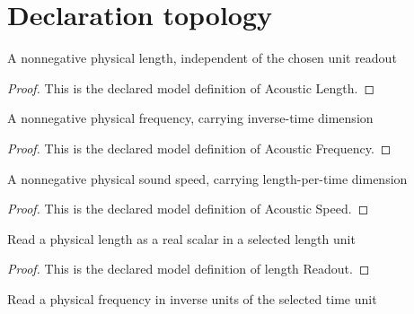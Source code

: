 \section{Declaration topology}
\begin{definition}
  \label{def:physics:phyx-mini-0217:phyxminiproblems-problemphyxmini0217-acousticlength}
  A nonnegative physical length, independent of the chosen unit readout
\end{definition}
\begin{proof}
  This is the declared model definition of Acoustic Length.
\end{proof}
\begin{definition}
  \label{def:physics:phyx-mini-0217:phyxminiproblems-problemphyxmini0217-acousticfrequency}
  A nonnegative physical frequency, carrying inverse-time dimension
\end{definition}
\begin{proof}
  This is the declared model definition of Acoustic Frequency.
\end{proof}
\begin{definition}
  \label{def:physics:phyx-mini-0217:phyxminiproblems-problemphyxmini0217-acousticspeed}
  A nonnegative physical sound speed, carrying length-per-time dimension
\end{definition}
\begin{proof}
  This is the declared model definition of Acoustic Speed.
\end{proof}
\begin{definition}
  \label{def:physics:phyx-mini-0217:phyxminiproblems-problemphyxmini0217-lengthreadout}
  Read a physical length as a real scalar in a selected length unit
\end{definition}
\begin{proof}
  This is the declared model definition of length Readout.
\end{proof}
\begin{definition}
  \label{def:physics:phyx-mini-0217:phyxminiproblems-problemphyxmini0217-frequencyreadout}
  Read a physical frequency in inverse units of the selected time unit
\end{definition}
